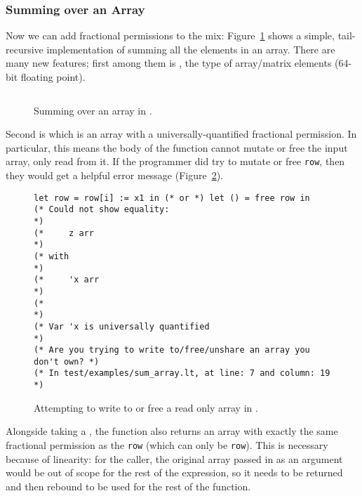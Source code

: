 \subsubsection{Summing over an Array}

Now we can add fractional permissions to the mix:
Figure~\ref{fig:lang_sumarray} shows a simple, tail-recursive implementation of
summing all the elements in an array. There are many new features; first among
them is , the type of array/matrix elements (64-bit floating
point).

\begin{figure}[t]
    \centering
    \inputminted[fontsize=\small]{ocaml}{../../test/examples/sum_array.lt}
    \caption{Summing over an array in \lang.}\label{fig:lang_sumarray}
\end{figure}

Second is  which is an array with a
universally-quantified fractional permission. In particular, this means the
body of the function cannot mutate or free the input array, only read from it.
If the programmer did try to mutate or free \texttt{row}, then they would get a
helpful error message (Figure~\ref{fig:lang_errormsg}).

\begin{figure}[t]
    \centering
    \begin{verbatim}
let row = row[i] := x1 in (* or *) let () = free row in
(* Could not show equality:                                        *)
(*     z arr                                                       *)
(* with                                                            *)
(*     'x arr                                                      *)
(*                                                                 *)
(* Var 'x is universally quantified                                *)
(* Are you trying to write to/free/unshare an array you don't own? *)
(* In test/examples/sum_array.lt, at line: 7 and column: 19        *)
    \end{verbatim}
    \caption{Attempting to write to or free a read only array in
    \lang.}\label{fig:lang_errormsg}
\end{figure}

Alongside taking a , the function also returns an array
with exactly the same fractional permission as the \texttt{row} (which can only
be \texttt{row}).  This is necessary because of linearity: for the caller, the
original array passed in as an argument would be out of scope for the rest of
the expression, so it needs to be returned and then rebound to be used for the
rest of the function.

